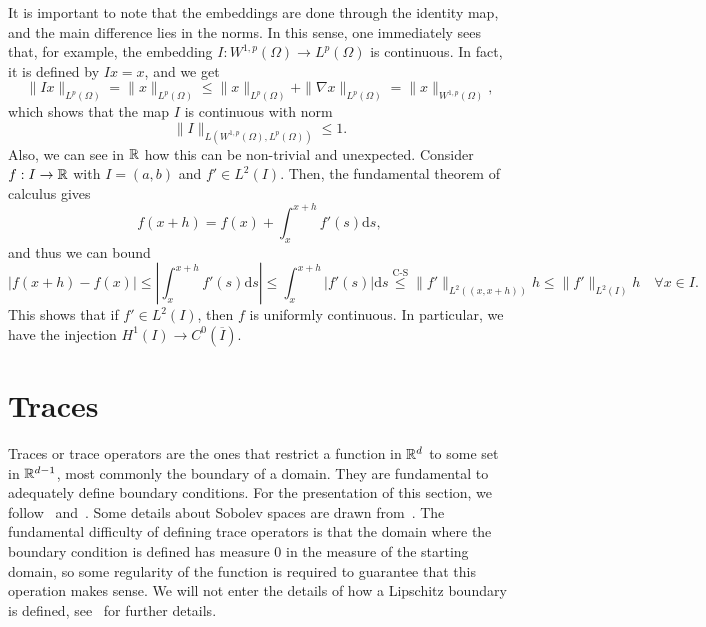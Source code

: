 It is important to note that the embeddings are done through the identity map, and the main difference lies in the norms. In this sense, one immediately sees that, for example, the embedding $I:W^{1,p}(\Omega)\to L^p(\Omega)$ is continuous. In fact, it is defined by $Ix=x$, and we get
\begin{equation*}
    \|Ix\|_{L^p(\Omega)} = \|x\|_{L^p(\Omega)} \leq \|x\|_{L^p(\Omega)} + \|\nabla x\|_{L^p(\Omega)} = \|x\|_{W^{1,p}(\Omega)},
\end{equation*}
which shows that the map $I$ is continuous with norm 
\begin{equation*}
    \|I\|_{L(W^{1,p}(\Omega), L^p(\Omega))}\leq 1.
\end{equation*}
Also, we can see in $\mathbb{R}$ how this can be non-trivial and unexpected. Consider $f:I\to \mathbb{R}$ with $I=(a,b)$ and $f'\in L^2(I)$. Then, the fundamental theorem of calculus gives
\begin{equation*}
    f(x+h) = f(x) + \int_x^{x+h}f'(s)\mathrm{d}s,
\end{equation*}
and thus we can bound
\begin{equation*}
    |f(x+h)-f(x)|\leq \left|\int_x^{x+h}f'(s)\mathrm{d}s\right|\leq \int_x^{x+h}|f'(s)|\mathrm{d}s \overset{\text{C-S}}{\leq} \|f'\|_{L^2((x,x+h))}h \leq \|f'\|_{L^2(I)}h \quad \forall x\in I.
\end{equation*}
This shows that if $f'\in L^2(I)$, then $f$ is uniformly continuous. In particular, we have the injection $H^1(I)\to C^0(\overline{I})$. 

\section{Traces}\label{sec:traces}
Traces or trace operators are the ones that restrict a function in $\mathbb{R}^d$ to some set in $\mathbb{R}^{d-1}$, most commonly the boundary of a domain. They are fundamental to adequately define boundary conditions. For the presentation of this section, we follow~\cite{gatica2014simple} and~\cite{monk2003finite}. Some details about Sobolev spaces are drawn from~\cite{adams2003sobolev}. The fundamental difficulty of defining trace operators is that the domain where the boundary condition is defined has measure 0 in the measure of the starting domain, so some regularity of the function is required to guarantee that this operation makes sense. We will not enter the details of how a Lipschitz boundary is defined, see~\cite{monk2003finite} for further details.

